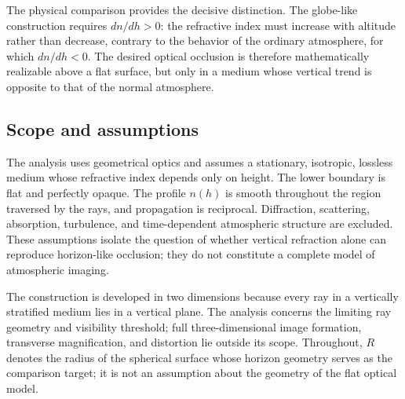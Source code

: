 The physical comparison provides the decisive distinction. The globe-like
construction requires $dn/dh>0$: the refractive index must increase with
altitude rather than decrease, contrary to the behavior of the ordinary
atmosphere, for which $dn/dh<0$. The desired optical occlusion is
therefore mathematically realizable above a flat surface, but only in a medium
whose vertical trend is opposite to that of the normal atmosphere.

\subsection{Scope and assumptions}
\label{sec:scope}

The analysis uses geometrical optics and assumes a stationary, isotropic,
lossless medium whose refractive index depends only on height. The lower
boundary is flat and perfectly opaque. The profile $n(h)$ is smooth throughout
the region traversed by the rays, and propagation is reciprocal. Diffraction,
scattering, absorption, turbulence, and time-dependent atmospheric structure
are excluded. These assumptions isolate the question of whether vertical
refraction alone can reproduce horizon-like occlusion; they do not constitute a
complete model of atmospheric imaging.

The construction is developed in two dimensions because every ray in a
vertically stratified medium lies in a vertical plane. The analysis concerns
the limiting ray geometry and visibility threshold; full three-dimensional
image formation, transverse magnification, and distortion lie outside its
scope. Throughout, $R$ denotes the radius of the spherical surface whose
horizon geometry serves as the comparison target; it is not an assumption
about the geometry of the flat optical model.
